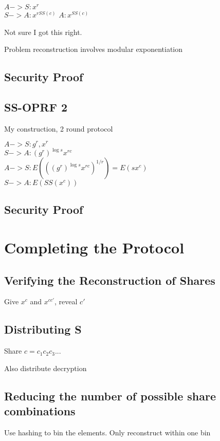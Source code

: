 \documentclass[10pt, sigconf]{acmart}
\begin{document}
$A -> S: x^r$ \\
$S -> A: x^{rSS(c)}$
$A: x^{SS(c)}$

Not sure I got this right.

Problem reconstruction involves modular exponentiation

\subsection{Security Proof}

\subsection{SS-OPRF 2}

My construction, 2 round protocol

$A -> S: g^r, x^r$ \\
$S -> A: (g^r)^{\log s} x^{rc}$ \\
$A -> S: E(((g^r)^{\log s} x^{rc})^{1/r}) = E(s x^c)$ \\
$S -> A: E(SS(x^c))$

\subsection{Security Proof}

\section{Completing the Protocol}

\subsection{Verifying the Reconstruction of Shares}

Give $x^c$ and $x^{cc'}$, reveal $c'$

\subsection{Distributing S}

Share $c = c_1 c_2 c_3 ...$

Also distribute decryption

\subsection{Reducing the number of possible share combinations}

Use hashing to bin the elements.  Only reconstruct within one bin
\end{document}

